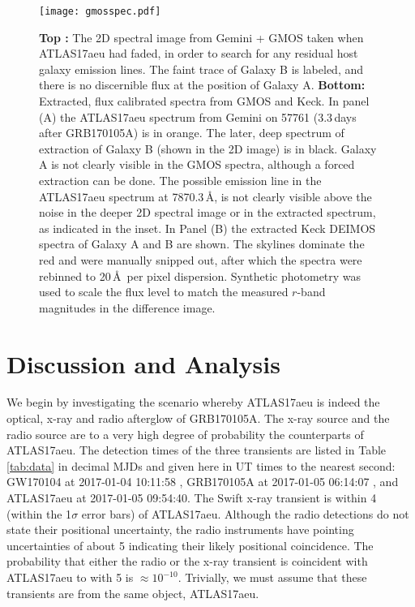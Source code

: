 \documentclass[twocolumn]{aastex61}
\begin{document}
\begin{figure*}
\centering
\texttt{[image: gmosspec.pdf]}
\caption{{\bf Top :} The 2D spectral image from Gemini + GMOS taken when 
ATLAS17aeu had faded, in order to search for any residual host galaxy emission lines. The faint trace of Galaxy B is labeled, and there is no discernible 
flux at the position of Galaxy A. 
{\bf Bottom:} Extracted, flux calibrated spectra from GMOS and Keck. In panel (A) the ATLAS17aeu spectrum 
from Gemini on 57761 (3.3\,days after GRB170105A) is in orange. The later, deep spectrum of extraction of Galaxy B (shown in the 2D image) is in black. Galaxy A is not clearly visible in the GMOS spectra, although a forced extraction can be done. The possible emission line in
the ATLAS17aeu spectrum at 7870.3\,\AA, is not clearly visible above the noise in the deeper
2D spectral image or in the extracted spectrum, as
indicated in the inset.
 In Panel (B) the extracted Keck DEIMOS spectra of Galaxy A and B are shown. The skylines dominate the red and were manually snipped out, after which the spectra were rebinned to 20\,\AA\ per pixel dispersion. Synthetic photometry was used to scale the flux level to match the measured $r$-band magnitudes in the difference image. }
\label{fig:spec2D}
\end{figure*}




\section{Discussion and Analysis}
\label{sec:disc}

We begin by investigating the scenario whereby  ATLAS17aeu is indeed the optical, x-ray and radio afterglow 
of GRB170105A.   The x-ray source and the radio source are to a very high degree of probability the counterparts
of ATLAS17aeu.  The detection times of the three transients are listed in Table\,\ref{tab:data}  in decimal 
MJDs and given here in UT times to the nearest second:
GW170104 at 2017-01-04 10:11:58 
\citep{gw170104}, 
GRB170105A at 2017-01-05 06:14:07
\citep{GCN20387,GCN20389},
and ATLAS17aeu at 2017-01-05 09:54:40.
The Swift x-ray transient is within 4 (within the 1$\sigma$ error bars) of ATLAS17aeu.  
Although the radio detections do not state their positional uncertainty, the radio instruments have pointing uncertainties of about 5 indicating their likely positional coincidence.
The probability that either the radio or the x-ray transient is coincident with ATLAS17aeu to with 5 is $\approx 10^{-10}$. Trivially, we must assume that these transients are from the same object, ATLAS17aeu. 
\end{document}
